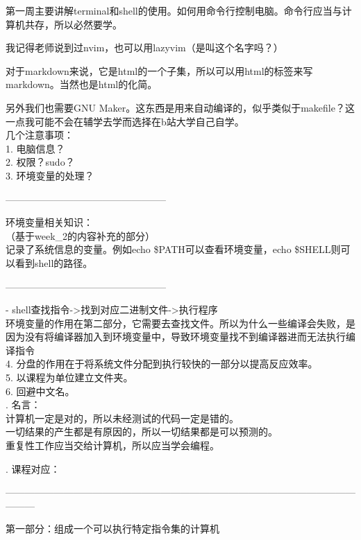 \documentclass{article}
\begin{document}
第一周主要讲解terminal和shell的使用。如何用命令行控制电脑。命令行应当与计算机共存，所以必然要学。

我记得老师说到过nvim，也可以用lazyvim（是叫这个名字吗？）

对于markdown来说，它是html的一个子集，所以可以用html的标签来写markdown。当然也是html的化简。

另外我们也需要GNU Maker。这东西是用来自动编译的，似乎类似于makefile？这一点我可能不会在辅学去学而选择在b站大学自己自学。
\\

\noindent 几个注意事项：\\
1. 电脑信息？\\
2. 权限？sudo？\\
3. 环境变量的处理？\\
\begin{center}
    --------------------------------------------------
\end{center}
环境变量相关知识：\\
（基于week\_2的内容补充的部分）\\
记录了系统信息的变量。例如echo \$PATH可以查看环境变量，echo \$SHELL则可以看到shell的路径。\\
\begin{center}
    --------------------------------------------------
\end{center}
- shell查找指令->找到对应二进制文件->执行程序\\
环境变量的作用在第二部分，它需要去查找文件。所以为什么一些编译会失败，是因为没有将编译器加入到环境变量中，导致环境变量找不到编译器进而无法执行编译指令\\
4. 分盘的作用在于将系统文件分配到执行较快的一部分以提高反应效率。\\
5. 以课程为单位建立文件夹。\\
6. 回避中文名。\\

. 名言：\\
计算机一定是对的，所以未经测试的代码一定是错的。\\
一切结果的产生都是有原因的，所以一切结果都是可以预测的。\\
重复性工作应当交给计算机，所以应当学会编程。

. 课程对应：

\begin{center}
    ———————————————————————————————————————
\end{center}
第一部分：组成一个可以执行特定指令集的计算机\\
\end{document}
